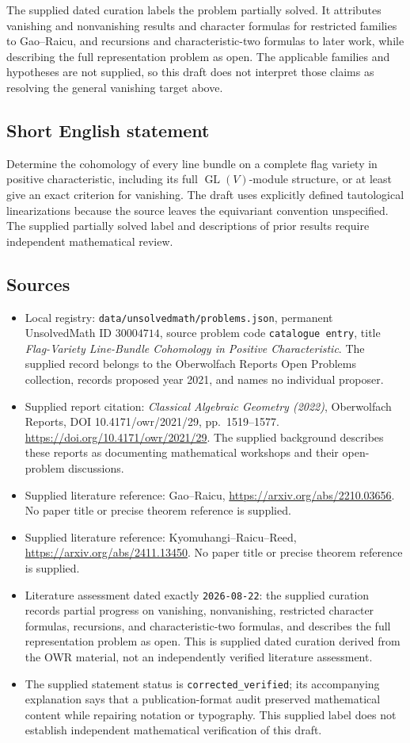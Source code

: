 \documentclass[11pt]{article}
\begin{document}
The supplied dated curation labels the problem partially solved. It attributes vanishing and nonvanishing results and character formulas for restricted families to Gao--Raicu, and recursions and characteristic-two formulas to later work, while describing the full representation problem as open. The applicable families and hypotheses are not supplied, so this draft does not interpret those claims as resolving the general vanishing target above.
\subsection{Short English statement}
Determine the cohomology of every line bundle on a complete flag variety in positive characteristic, including its full \(\operatorname{GL}(V)\)-module structure, or at least give an exact criterion for vanishing. The draft uses explicitly defined tautological linearizations because the source leaves the equivariant convention unspecified. The supplied partially solved label and descriptions of prior results require independent mathematical review.
\subsection{Sources}
\begin{itemize}
\item Local registry: \texttt{data/unsolvedmath/problems.json}, permanent UnsolvedMath ID \(30004714\), source problem code \texttt{catalogue entry}, title \emph{Flag-Variety Line-Bundle Cohomology in Positive Characteristic}. The supplied record belongs to the Oberwolfach Reports Open Problems collection, records proposed year 2021, and names no individual proposer.
\item Supplied report citation: \emph{Classical Algebraic Geometry (2022)}, Oberwolfach Reports, DOI 10.4171/owr/2021/29, pp.\ 1519--1577. \url{https://doi.org/10.4171/owr/2021/29}. The supplied background describes these reports as documenting mathematical workshops and their open-problem discussions.
\item Supplied literature reference: Gao--Raicu, \url{https://arxiv.org/abs/2210.03656}. No paper title or precise theorem reference is supplied.
\item Supplied literature reference: Kyomuhangi--Raicu--Reed, \url{https://arxiv.org/abs/2411.13450}. No paper title or precise theorem reference is supplied.
\item Literature assessment dated exactly \texttt{2026-08-22}: the supplied curation records partial progress on vanishing, nonvanishing, restricted character formulas, recursions, and characteristic-two formulas, and describes the full representation problem as open. This is supplied dated curation derived from the OWR material, not an independently verified literature assessment.
\item The supplied statement status is \texttt{corrected\_verified}; its accompanying explanation says that a publication-format audit preserved mathematical content while repairing notation or typography. This supplied label does not establish independent mathematical verification of this draft.
\end{itemize}
\end{document}

